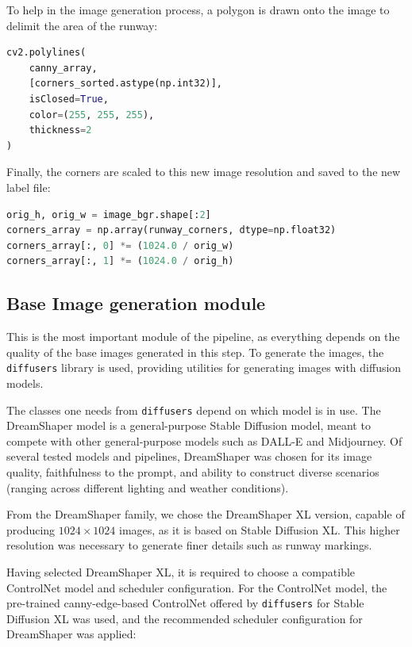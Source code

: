 To help in the image generation process, a polygon is drawn onto the image to delimit the area of the runway:

\begin{lstlisting}[language=Python, caption={Edge extraction module,
polygon drawing in canny edge image}]
cv2.polylines(
    canny_array,
    [corners_sorted.astype(np.int32)],
    isClosed=True,
    color=(255, 255, 255),
    thickness=2
)
\end{lstlisting}

Finally, the corners are scaled to this new image resolution and saved to the new label file:

\begin{lstlisting}[language=Python, caption={Edge extraction module,
scaling corners to new resolution}]
orig_h, orig_w = image_bgr.shape[:2]
corners_array = np.array(runway_corners, dtype=np.float32)
corners_array[:, 0] *= (1024.0 / orig_w)
corners_array[:, 1] *= (1024.0 / orig_h)
\end{lstlisting}

\subsection{Base Image generation module}

This is the most important module of the pipeline, as everything depends on the quality of the base images generated in this step. 
To generate the images, the \texttt{diffusers} library \cite{noauthor_diffusers_nodate} is used, providing utilities for generating images with diffusion models.

The classes one needs from \texttt{diffusers} depend on which model is in use. 
The DreamShaper model \cite{noauthor_dreamshaper_2025} is a general-purpose Stable Diffusion model, meant to compete with other general-purpose models such as DALL-E and Midjourney. 
Of several tested models and pipelines, DreamShaper was chosen for its image quality, faithfulness to the prompt, and ability to construct diverse scenarios (ranging across different lighting and weather conditions).

From the DreamShaper family, we chose the DreamShaper XL version, capable of producing $1024 \times 1024$ images, as it is based on Stable Diffusion XL. 
This higher resolution was necessary to generate finer details such as runway markings.

Having selected DreamShaper XL, it is required to choose a compatible ControlNet
model and scheduler configuration. 
For the ControlNet model, the pre-trained canny-edge-based ControlNet offered by \texttt{diffusers} for Stable Diffusion XL was used, and the recommended scheduler configuration for DreamShaper was applied:

